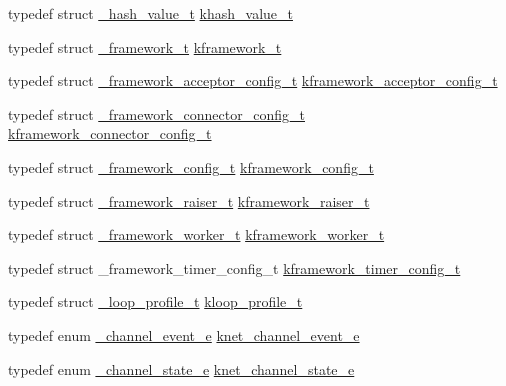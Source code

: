 \begin{DoxyCompactItemize}
\item 
typedef struct \hyperlink{a00016}{\+\_\+hash\+\_\+value\+\_\+t} \hyperlink{a00051_aa13ac88a5567525fe44f3670134c3d96_aa13ac88a5567525fe44f3670134c3d96}{khash\+\_\+value\+\_\+t}
\item 
typedef struct \hyperlink{a00013}{\+\_\+framework\+\_\+t} \hyperlink{a00051_a3195a3be35782fc1efb920c811be111d_a3195a3be35782fc1efb920c811be111d}{kframework\+\_\+t}
\item 
typedef struct \hyperlink{a00009}{\+\_\+framework\+\_\+acceptor\+\_\+config\+\_\+t} \hyperlink{a00051_a39c993eb450173e4fde04498d757f9b6_a39c993eb450173e4fde04498d757f9b6}{kframework\+\_\+acceptor\+\_\+config\+\_\+t}
\item 
typedef struct \hyperlink{a00011}{\+\_\+framework\+\_\+connector\+\_\+config\+\_\+t} \hyperlink{a00051_a44d3033eba5a4fd784a741700a7a2521_a44d3033eba5a4fd784a741700a7a2521}{kframework\+\_\+connector\+\_\+config\+\_\+t}
\item 
typedef struct \hyperlink{a00010}{\+\_\+framework\+\_\+config\+\_\+t} \hyperlink{a00051_adeaf952e0f0887507ff836385bf54874_adeaf952e0f0887507ff836385bf54874}{kframework\+\_\+config\+\_\+t}
\item 
typedef struct \hyperlink{a00012}{\+\_\+framework\+\_\+raiser\+\_\+t} \hyperlink{a00051_af10637001508cbbf3a84f95c71318532_af10637001508cbbf3a84f95c71318532}{kframework\+\_\+raiser\+\_\+t}
\item 
typedef struct \hyperlink{a00014}{\+\_\+framework\+\_\+worker\+\_\+t} \hyperlink{a00051_af2a7f5b8406de73682f8bd4c2afee783_af2a7f5b8406de73682f8bd4c2afee783}{kframework\+\_\+worker\+\_\+t}
\item 
typedef struct \+\_\+framework\+\_\+timer\+\_\+config\+\_\+t \hyperlink{a00051_a6b9282027a882fd53a0d7247e69bc1c1_a6b9282027a882fd53a0d7247e69bc1c1}{kframework\+\_\+timer\+\_\+config\+\_\+t}
\item 
typedef struct \hyperlink{a00031}{\+\_\+loop\+\_\+profile\+\_\+t} \hyperlink{a00051_ab75a5c23099a6118c469ed160b277f28_ab75a5c23099a6118c469ed160b277f28}{kloop\+\_\+profile\+\_\+t}
\item 
typedef enum \hyperlink{a00051_a1460362ccf3a6ba930a1a3ac2f73f3ea_a1460362ccf3a6ba930a1a3ac2f73f3ea}{\+\_\+channel\+\_\+event\+\_\+e} \hyperlink{a00051_accd62b4c787cfb91e81aa14210302863_accd62b4c787cfb91e81aa14210302863}{knet\+\_\+channel\+\_\+event\+\_\+e}
\item 
typedef enum \hyperlink{a00051_a18bbc160902cdba0f52f5a3cd879b47f_a18bbc160902cdba0f52f5a3cd879b47f}{\+\_\+channel\+\_\+state\+\_\+e} \hyperlink{a00051_a74ff83eaafca5c7093accdc65c6b0646_a74ff83eaafca5c7093accdc65c6b0646}{knet\+\_\+channel\+\_\+state\+\_\+e}

\end{DoxyCompactItemize}
